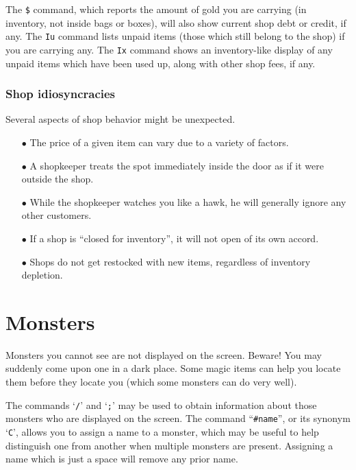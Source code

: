 The {\tt \$} command, which reports the amount of gold you are carrying
(in inventory, not inside bags or boxes), will also show current shop
debt or credit, if any.  The {\tt Iu} command lists unpaid items
(those which still belong to the shop) if you are carrying any.
The {\tt Ix} command shows an inventory-like display of any unpaid
items which have been used up, along with other shop fees, if any.

\subsubsection*{Shop idiosyncracies}

Several aspects of shop behavior might be unexpected.

\begin{itemize}
\item[$\bullet$]
The price of a given item can vary due to a variety of factors.
\item[$\bullet$]
A shopkeeper treats the spot immediately inside the door as if it were
outside the shop.
\item[$\bullet$]
While the shopkeeper watches you like a hawk, he will generally ignore
any other customers.
\item[$\bullet$]
If a shop is ``closed for inventory'', it will not open of its own accord.
\item[$\bullet$]
Shops do not get restocked with new items, regardless of inventory depletion.
\end{itemize}

\section{Monsters}

Monsters you cannot see are not displayed on the screen.  Beware!
You may suddenly come upon one in a dark place.  Some magic items can
help you locate them before they locate you (which some monsters can do
very well).

The commands `{\tt /}' and `{\tt ;}' may be used to obtain information
about those
monsters who are displayed on the screen.  The command ``{\tt \#name}'', or
its synonym `{\tt C}', allows you
to assign a name to a monster, which may be useful to help distinguish
one from another when multiple monsters are present.  Assigning a name
which is just a space will remove any prior name.

